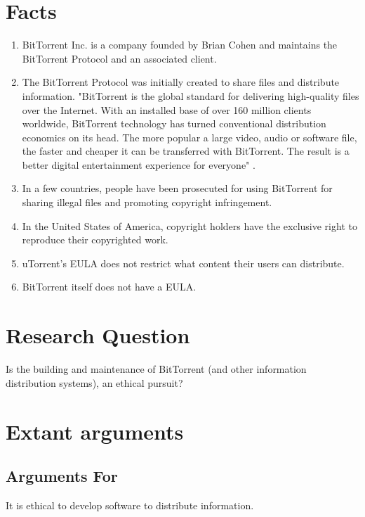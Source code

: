 \documentclass[11pt]{article}
\begin{document}
\section{Facts}
\begin{enumerate}
\item BitTorrent Inc. is a company founded by Brian Cohen and maintains the BitTorrent Protocol and an associated client. \cite{btabout}
\item The BitTorrent Protocol was initially created to share files and distribute information. "BitTorrent is the global standard for delivering high-quality files over the Internet. With an installed base of over 160 million clients worldwide, BitTorrent technology has turned conventional distribution economics on its head. The more popular a large video, audio or software file, the faster and cheaper it can be transferred with BitTorrent. The result is a better digital entertainment experience for everyone" \cite{btabout}.
\item In a few countries, people have been prosecuted for using BitTorrent for sharing illegal files and promoting copyright infringement. \cite{tpbverdict}
\item In the United States of America, copyright holders have the exclusive right to reproduce their copyrighted work. \cite{t17c1s106}
\item uTorrent's EULA does not restrict what content their users can distribute. \cite{utorrentEula}
\item BitTorrent itself does not have a EULA. \cite{utorrentEula}
\end{enumerate}

\section{Research Question}
Is the building and maintenance of BitTorrent (and other information distribution systems), an ethical pursuit?

\section{Extant arguments}

\subsection{Arguments For}
It is ethical to develop software to distribute information.
\end{document}
